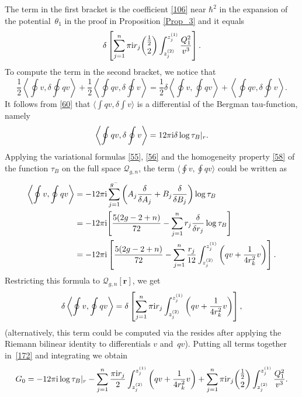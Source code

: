 \documentclass[pdftex]{sigma}
\numberwithin{equation}{section}
\theoremstyle{definition}
\begin{document}
The term in the first bracket is the coefficient \eqref{106} near $\hbar^2$ in the expansion of the potential~$\theta_1$ in the proof in Proposition \ref{Prop_3} and it equals
\begin{equation*}%
\delta\left[\sum^n_{j=1}
\pi{\rm i} r_j \binom{\frac{1}{2}}{2}\int^{z^{(1)}_j}_{z^{(2)}_j}\frac{{Q^2_1}}{v^{3}} \right]. \end{equation*}
To compute the term in the second bracket, we notice that
\begin{equation*}%
\frac{1}{2}\left\langle \oint v,\delta \oint qv\right\rangle +\frac{1}{2}\left\langle \oint qv,\delta \oint v\right\rangle =\frac{1}{2}\delta\left\langle \oint v, \oint qv\right\rangle +\left\langle \oint qv,\delta \oint v\right\rangle. \end{equation*}
It follows from \eqref{60} that $\big\langle \int qv,\delta \int v\big\rangle $ is a differential of the Bergman tau-function, namely
\begin{equation*}%
\left\langle \oint qv,\delta \oint v\right\rangle =12 \pi{\rm i} \delta \log \tau_B |_{r}.\end{equation*}
Applying the variational formulas \eqref{55}, \eqref{56} and the homogeneity property \eqref{58} of the function $\tau_B$ on the full space $\mathcal{Q}_{g,n}$, the term $\big\langle \oint v, \oint qv\big\rangle $ could be written as
\begin{align*}%
\left\langle \oint v,\oint qv\right\rangle& =-12 \pi{\rm i} \sum^{g^-}_{j=1}\left(A_j \frac{\delta}{\delta A_j}+B_j \frac{\delta}{\delta B_j}\right) \log \tau_B\\
& =-12 \pi{\rm i} \Bigg[\frac{5(2g-2+n)}{72}-\sum^n_{j=1}r_j \frac{\delta}{\delta r_j}\log \tau_B \Bigg] \\
& =-12 \pi{\rm i} \left[\frac{5(2g-2+n)}{72}-\sum^n_{j=1}\frac{r_j}{12} \int^{z^{(1)}_j}_{z^{(2)}_j}\left(qv+\frac{1}{4r^2_k}v \right) \right].
\end{align*}
Restricting this formula to $\mathcal{Q}_{g,n}[\mathbf{r}]$, we get
\begin{equation*}%
\delta\left\langle \oint v, \oint qv\right\rangle =\delta\left[\sum^n_{j=1}{\pi{\rm i} r_j} \int^{z^{(1)}_j}_{z^{(2)}_j}\left(qv+\frac{1}{4r^2_k}v \right) \right],
\end{equation*}
(alternatively, this term could be computed via the resides after applying the Riemann bilinear identity to differentials $v$ and~$qv$). Putting all terms together in~\eqref{172} and integrating we obtain%
\begin{equation}\label{178}G_0=-12 \pi{\rm i} \log \tau_B|_{r} -\sum^n_{j=1}\frac{\pi{\rm i} r_j}{2} \int^{z^{(1)}_j}_{z^{(2)}_j}\left(qv+\frac{1}{4r^2_k}v \right)+\sum^n_{j=1}
\pi{\rm i} r_j \binom{\frac{1}{2}}{2}\int^{z^{(1)}_j}_{z^{(2)}_j}\frac{{Q^2_1}}{v^{3}}.
\end{equation}
\end{document}
